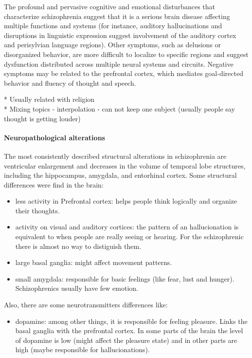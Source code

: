 \documentclass[12pt,article,oneside,a4paper]{memoir}
\begin{document}
The profound and pervasive cognitive and emotional disturbances that characterize
schizophrenia suggest that it is a serious brain disease affecting multiple
functions and systems (for instance, auditory hallucinations and disruptions in
linguistic expression suggest involvement of the auditory cortex and perisylvian
language regions). Other symptoms, such as delusions or disorganized behavior,
are more difficult to localize to specific regions and suggest dysfunction
distributed across multiple neural systems and circuits. Negative symptoms may
be related to the prefrontal cortex, which mediates goal-directed behavior and
fluency of thought and speech.

* Usually related with religion \\
* Mixing topics - interpolation - can not keep one subject (usually people say 
thought is getting louder)\\

\paragraph{Neuropathological alterations}
The most consistently described structural alterations in schizophrenia are
ventricular enlargement and decreases in the volume of temporal lobe structures,
including the hippocampus, amygdala, and entorhinal cortex.
Some structural differences were find in the brain:
\begin{itemize}
\item less activity in Prefrontal cortex: helps people think logically and
organize their thoughts.
\item activity on visual and auditory cortices: the pattern of an
hallucionation is equivalent to when people are really seeing or hearing. For 
the schizophrenic there is almost no way to distiguish them.
\item large basal ganglia: might affect movement patterns.
\item small amygdala: responsible for basic feelings (like fear, lust and
hunger). Schizophrenics usually have few emotion.
\end{itemize}

Also, there are some neurotransmitters differences like:
\begin{itemize}
\item dopamine: among other things, it is responsible for feeling pleasure.
Links the basal ganglia with the prefrontal cortex. In some parts of the brain
the level of dopamine is low (might affect the pleasure state) and in other
parts are high (maybe responsible for hallucionations).
\end{itemize}
\end{document}
